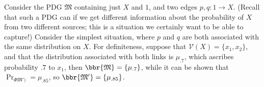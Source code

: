 \documentclass{article}
\theoremstyle{plain}
\theoremstyle{definition}
\newenvironment{example}
	{\pushQED{\qed}\renewcommand{\qedsymbol}{$\triangle$}\examplex}
	{\popQED\endexamplex%
}
\theoremstyle{remark}
\newcommand{\V}{\mathcal V}
\newcommand{\dg}[1]{\mathfrak{#1}}
\newcommand\Gib{\mathit{Gib}}
\numberwithin{equation}{section}
\begin{document}
\begin{example}\label{ex:overdet}
Consider the PDG $\dg M$ containing just $X$ and $1$, and two edges
$p, q: 1 \to X$.
(Recall that such a PDG can if we get different information about the
probability of $X$ from two different sources; this is a situation we
certainly want to be able to capture!)
Consider the simplest situation, where $p$ and $q$ are both associated
with the same distribution on $X$.  For definiteness, suppose that
$\V(X) = \{x_1,x_2\}$, 
%
%
%
and
%
that the distribution associated with both links is $\mu_{.7}$, which ascribes
probability $.7$ to $x_1$, then  $\bbr{\dg M} = \{\mu_{.7}\}$, 
while it can be shown that 
$\Pr_{\Phi{{\dg M')}}} = \mu_{.85}$, so  $\bbr{\dg M'} = \{\mu_{.85}\}$.
\end{example}

\end{document}
